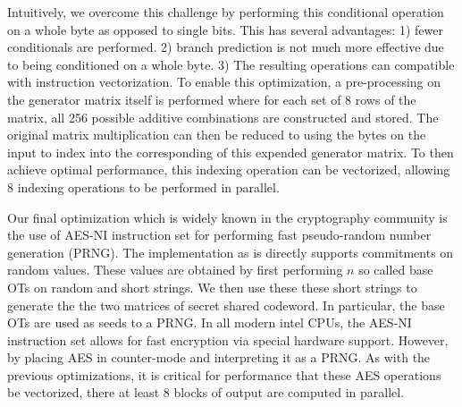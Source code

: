 Intuitively, we overcome this challenge by performing this conditional operation on a whole byte as opposed to single bits. This has several advantages: 1) fewer conditionals are performed. 2) branch prediction is not much more effective due to being conditioned on a whole byte.  3) The resulting operations can compatible with instruction vectorization. To enable this optimization, a pre-processing on the generator matrix itself is performed where for each set of 8 rows of the matrix, all 256 possible additive combinations are constructed and stored. The original matrix multiplication can then be reduced to using the bytes on the input to index into the corresponding of this expended generator matrix. To then achieve optimal performance, this indexing operation can be vectorized, allowing 8 indexing operations to be performed in parallel. 

Our final optimization which is widely known in the cryptography community is the use of AES-NI instruction set for performing fast pseudo-random number generation (PRNG). The implementation as is directly supports commitments on random values. These values are obtained by first performing $n$ so called base OTs on random and short strings. We then use these these short strings to generate the the two matrices of secret shared codeword. In particular, the base OTs are used as seeds to a PRNG. In all modern intel CPUs, the AES-NI instruction set allows for fast encryption via special hardware support. However, by placing AES in counter-mode and interpreting it as a PRNG. As with the previous optimizations, it is critical for performance that these AES operations be vectorized, there at least 8 blocks of output are computed in parallel.
